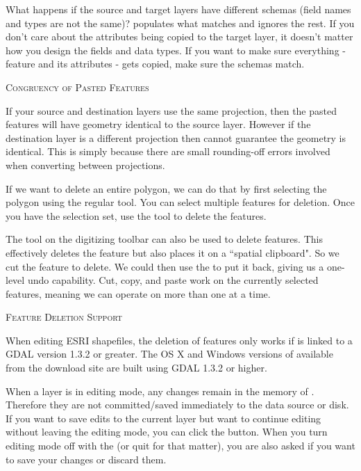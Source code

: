 What happens if the source and target layers have
different schemas (field names and types are not the same)? \qg populates
what matches and ignores the rest. If you don't care about the attributes
being copied to the target layer, it doesn't matter how you design the
fields and data types. If you want to make sure everything - feature and its
attributes - gets copied, make sure the schemas match.

\begin{Tip}\caption{\textsc{Congruency of Pasted Features}}
If your source and destination layers use the
same projection, then the pasted features will have
geometry identical to the source layer.
However if the destination layer is a different projection
then \qg cannot guarantee the geometry is identical.
This is simply because there are small rounding-off errors
involved when converting between projections.
\end{Tip}


If we want to delete an entire polygon, we can do that by first selecting
the polygon using the regular  tool. You can select
multiple features for deletion. Once you have the selection set, use the
 tool to delete the features.

The  tool on the digitizing toolbar can
also be used to delete features. This effectively deletes the feature but
also places it on a ``spatial clipboard". So we cut the feature to delete.
We could then use the  to put it back, giving us a one-level undo
capability. Cut, copy, and paste work on the currently selected features,
meaning we can operate on more than one at a time.

\begin{Tip}\caption{\textsc{Feature Deletion Support}}
When editing ESRI shapefiles, the deletion
of features only works if \qg is linked to a GDAL version 1.3.2 or greater.
The OS X and Windows versions of \qg available from the download site are built
using GDAL 1.3.2 or higher.
\end{Tip}


When a layer is in editing mode, any changes remain in the memory of \qg.
Therefore they are not committed/saved immediately to the data source or disk.
If you want to save edits to the current layer but want to continue editing
without leaving the editing mode, you can click the
 button. When you turn editing mode
off with the  (or quit
\qg for that matter), you are also asked if you want to save your changes
or discard them.

